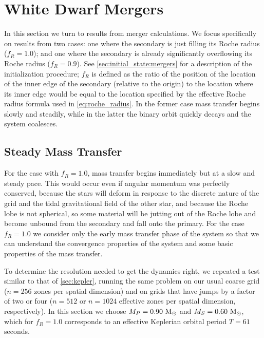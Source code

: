 \documentclass[12pt]{article}
\begin{document}
\newpage
\section{White Dwarf Mergers}
\label{sec:mergers}

In this section we turn to results from merger calculations. We focus specifically on
results from two cases: one where the secondary is just filling its Roche radius ($f_R = 1.0$);
and one where the secondary is already significantly overflowing its Roche radius ($f_R = 0.9$).
See \autoref{sec:initial_state:mergers} for a description of the initialization procedure; $f_R$
is defined as the ratio of the position of the location of the inner edge of the secondary (relative to
the origin) to the location where its inner edge would be equal to the location specified by the
effective Roche radius formula used in \autoref{eq:roche_radius}. In the former case mass transfer
begins slowly and steadily, while in the latter the binary orbit quickly decays and the system coalesces.

\subsection{Steady Mass Transfer}
\label{sec:mergers:stable}

For the case with $f_R = 1.0$, mass transfer begins immediately but at a slow and steady pace.
This would occur even if angular momentum was perfectly conserved, because the stars will deform
in response to the discrete nature of the grid and the tidal gravitational field of the other
star, and because the Roche lobe is not spherical, so some material will be jutting out of the
Roche lobe and become unbound from the secondary and fall onto the primary. For the case $f_R = 1.0$
we consider only the early mass transfer phase of the system so that we can understand the
convergence properties of the system and some basic properties of the mass transfer.

To determine the resolution needed to get the dynamics right, we repeated a test similar to that
of \autoref{sec:kepler}, running the same problem on our usual coarse grid ($n = 256$ zones
per spatial dimension) and on grids that have jumps by a factor of two or four ($n = 512$ or
$n = 1024$ effective zones per spatial dimension, respectively). In this section we choose
$M_P = 0.90\ \mathrm{M}_\odot$ and $M_S = 0.60\ \mathrm{M}_\odot$, which for $f_R = 1.0$ corresponds to an effective
Keplerian orbital period $T = 61$ seconds.
\end{document}
